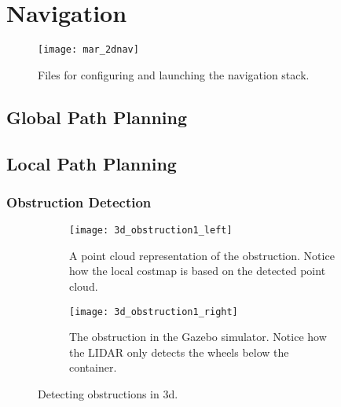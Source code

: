 \section{Navigation}

\begin{figure}[h]
	\centering
	\texttt{[image: mar\_2dnav]}
	\caption{Files for configuring and launching the navigation stack.}
	\label{fig:mar_2dnav}
\end{figure}

\subsection{Global Path Planning}

\subsection{Local Path Planning}

\subsubsection{Obstruction Detection}

\begin{figure}
	\centering
	\begin{subfigure}[b]{0.53\textwidth}
		\texttt{[image: 3d\_obstruction1\_left]}
		\caption{A point cloud representation of the obstruction. Notice how the local costmap is based on the detected point cloud.}
		\label{fig:device_select}
	\end{subfigure}
		\begin{subfigure}[b]{0.45\textwidth}
			\texttt{[image: 3d\_obstruction1\_right]}
			\caption{The obstruction in the Gazebo simulator. Notice how the LIDAR only detects the wheels below the container.}
			\label{fig:bt_request}
		\end{subfigure}
	\caption{\label{fig:3d_obstruction1}Detecting obstructions in 3d.}
\end{figure}